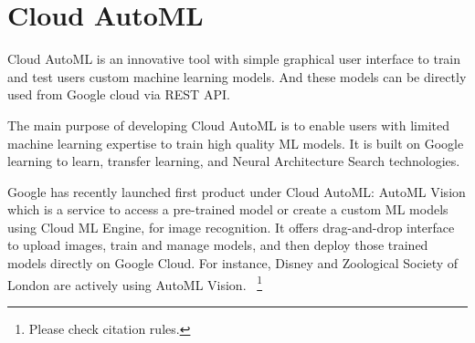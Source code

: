 \section{Cloud AutoML}

Cloud AutoML is an innovative tool with simple graphical user interface to train
and test users custom machine learning models. And these models can be directly
used from Google cloud via REST API.~\cite{hid-sp18-602-cloudautoml-main} 

The main purpose of developing Cloud AutoML is to enable users with limited 
machine learning expertise to train high quality ML models. It is built on Google
learning to learn, transfer learning, and Neural Architecture Search 
technologies.

Google has recently launched first product under Cloud AutoML: AutoML Vision 
which is a service to access a pre-trained model or create a custom ML models using
Cloud ML Engine, for image recognition. It offers drag-and-drop interface to 
upload images, train and manage models, and then deploy those trained models 
directly on Google Cloud. For instance, Disney and Zoological Society of London are
actively using AutoML Vision. ~\cite{hid-sp18-602-cloudautoml-blog}\footnote{Please check citation rules.}

